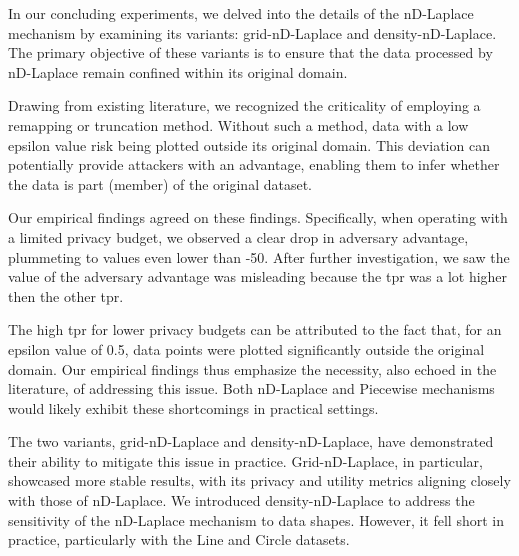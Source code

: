 In our concluding experiments, we delved into the details of the nD-Laplace mechanism by examining its variants: grid-nD-Laplace and density-nD-Laplace. The primary objective of these variants is to ensure that the data processed by nD-Laplace remain confined within its original domain.

Drawing from existing literature, we recognized the criticality of employing a remapping or truncation method. Without such a method, data with a low epsilon value risk being plotted outside its original domain. This deviation can potentially provide attackers with an advantage, enabling them to infer whether the data is part (member) of the original dataset.

Our empirical findings agreed on these findings. Specifically, when operating with a limited privacy budget, we observed a clear drop in adversary advantage, plummeting to values even lower than -50. After further investigation, we saw the value of the adversary advantage was misleading because the \gls{tpr} was a lot higher then the other \gls{tpr}.

The high \gls{tpr} for lower privacy budgets can be attributed to the fact that, for an epsilon value of 0.5, data points were plotted significantly outside the original domain. Our empirical findings thus emphasize the necessity, also echoed in the literature, of addressing this issue. Both nD-Laplace and Piecewise mechanisms would likely exhibit these shortcomings in practical settings.

The two variants, grid-nD-Laplace and density-nD-Laplace, have demonstrated their ability to mitigate this issue in practice. Grid-nD-Laplace, in particular, showcased more stable results, with its privacy and utility metrics aligning closely with those of nD-Laplace. We introduced density-nD-Laplace to address the sensitivity of the nD-Laplace mechanism to data shapes. However, it fell short in practice, particularly with the Line and Circle datasets.

